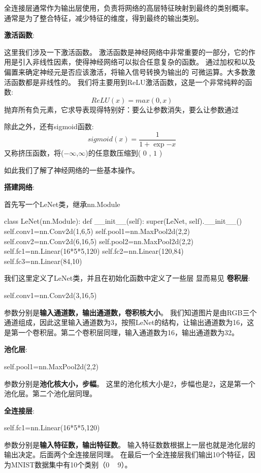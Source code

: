 全连接层通常作为输出层使用，负责将网络的高层特征映射到最终的类别概率。
通常是为了整合特征，减少特征的维度，得到最终的输出类别。

\textbf{激活函数}:

这里我们涉及一下激活函数。
激活函数是神经网络中非常重要的一部分，它的作用是引入非线性因素，使得神经网络可以拟合任意复杂的函数。
通过加权和以及偏置来确定神经元是否应该激活，将输入信号转换为输出的
可微运算。大多数激活函数都是非线性的。
我们将主要用到ReLU激活函数，这是一个非常纯粹的函数:
\begin{equation}
    ReLU(x)=max(0,x)
\end{equation}
抛弃所有负元素，它求导表现得特别好：要么让参数消失，要么让参数通过

除此之外，还有sigmoid函数:
\begin{equation}
    sigmoid(x)=\frac{1}{1+\exp{-x}} 
\end{equation}
又称挤压函数，将($-\infty$,$\infty$)的任意数压缩到( $0$ , $1$ )

如此我们了解了神经网络的一些基本操作。

\textbf{搭建网络}:

首先写一个LeNet类，继承nn.Module
\begin{tpython}
    class LeNet(nn.Module):
        def __init__(self):
            super(LeNet, self).__init__()
            self.conv1=nn.Conv2d(1,6,5)
            self.pool1=nn.MaxPool2d(2,2)
            self.conv2=nn.Conv2d(6,16,5)
            self.pool2=nn.MaxPool2d(2,2)
            self.fc1=nn.Linear(16*5*5,120)
            self.fc2=nn.Linear(120,84)
            self.fc3=nn.Linear(84,10)
\end{tpython}

我们这里定义了LeNet类，并且在初始化函数中定义了一些层
显而易见
\textbf{卷积层}:
\begin{tpython}
    self.conv1=nn.Conv2d(3,16,5)
\end{tpython}
参数分别是\textbf{输入通道数，输出通道数，卷积核大小}。
我们知道图片是由RGB三个通道组成，因此这里输入通道数为3，按照LeNet的结构，让输出通道数为16，这是第一个卷积层。第二个卷积层同理，输入通道数为16，输出通道数为32。

\textbf{池化层}:
\begin{tpython}
    self.pool1=nn.MaxPool2d(2,2)
\end{tpython}
参数分别是\textbf{池化核大小，步幅}。
这里的池化核大小是2，步幅也是2，这是第一个池化层。第二个池化层同理。

\textbf{全连接层}:
\begin{tpython}
    self.fc1=nn.Linear(16*5*5,120)
\end{tpython}
参数分别是\textbf{输入特征数，输出特征数}。
输入特征数数根据上一层也就是池化层的输出决定。后面两个全连接层同理。
在最后一个全连接层我们输出10个特征，因为MNIST数据集中有10个类别（0 ~ 9）。

